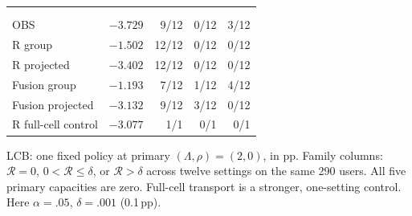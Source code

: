 \begingroup\small
\renewcommand{\arraystretch}{1.14}\setlength{\tabcolsep}{2pt}
\begin{tabular*}{\columnwidth}{@{\extracolsep{\fill}}lrrrr@{}}
\toprule
&  & \\
\cmidrule(lr){2-2}\cmidrule(lr){3-5}
 &  &  &  & \\
\midrule
OBS & $-3.729$ & 9/12 & 0/12 & 3/12\\
R group & $-1.502$ & 12/12 & 0/12 & 0/12\\
R projected & $-3.402$ & 12/12 & 0/12 & 0/12\\
\addlinespace[2pt]
Fusion group & $-1.193$ & 7/12 & 1/12 & 4/12\\
Fusion projected & $-3.132$ & 9/12 & 3/12 & 0/12\\
\midrule
R full-cell control & $-3.077$ & 1/1 & 0/1 & 0/1\\
\bottomrule
\end{tabular*}\endgroup\par
\smallskip
\parbox{\columnwidth}{\footnotesize\raggedright
LCB: one fixed policy at primary $(\Lambda,\rho)=(2,0)$, in pp. Family columns: $\mathcal R=0$, $0<\mathcal R\le\delta$, or $\mathcal R>\delta$ across twelve settings on the same 290 users. All five primary capacities are zero. Full-cell transport is a stronger, one-setting control. Here $\alpha=.05$, $\delta=.001$ (0.1\,pp).}
